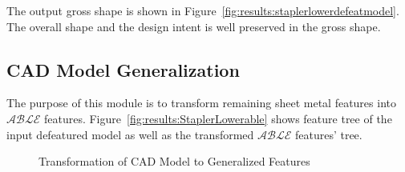 
%
%

The output gross shape is shown in Figure~\ref{fig:results:staplerlowerdefeatmodel}. The overall shape and the design intent is well preserved in the gross shape.

\subsection{CAD Model Generalization}

The purpose of this module is to transform remaining sheet metal features into $\mathcal{ABLE}$ features. Figure~\ref{fig:results:StaplerLowerable} shows feature tree of the input defeatured model as well as the transformed $\mathcal{ABLE}$ features' tree. 


\begin{figure}[!h]
\centering     %
{}\quad
{}
\caption{Transformation of CAD Model to Generalized Features}\label{fig:results:StaplerLowerfullable}
\end{figure}


